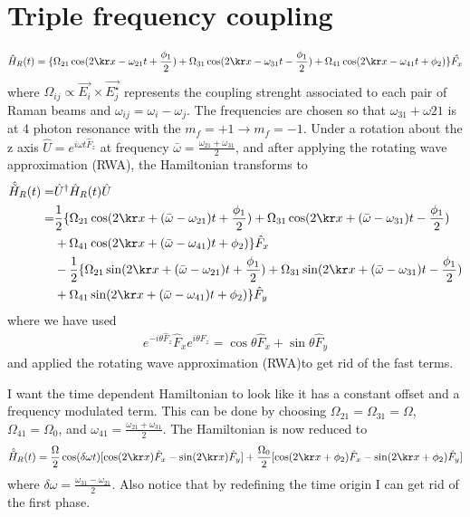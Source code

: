 \section{Triple frequency coupling}





%
\begin{align}
\hat{H}_R(t) = \lbrace\Omega_{21}\cos(2\kr x-\omega_{21} t +\frac{\phi_1}{2})+\Omega_{31}\cos(2\kr x-\omega_{31} t-\frac{\phi_1}{2})+\Omega_{41}\cos(2\kr x-\omega_{41} t + \phi_2)\rbrace\hat{F_x}
\end{align}
%
%
where $\Omega_{ij}\propto \vec{E_i}\times\vec{E_j^{\star}}$ represents the coupling strenght associated to each pair of Raman beams and $\omega_{ij} = \omega_{i}-\omega_{j} $. The frequencies are chosen so that $\omega_{31} + \omega{21}$ is at 4 photon resonance with the $m_f = +1\rightarrow m_f = -1$. Under a rotation about the z axis $\hat{U} = e^{i\omega t\hat{F}_z}$ at frequency $\bar{\omega} = \frac{\omega_{21}+\omega_{31}}{2}$, and after applying the rotating wave approximation (RWA), the Hamiltonian transforms to 
%
%
\begin{align}
\begin{split}
\hat{\tilde{H}}_R(t) = & \hat{U}^{\dagger} \hat{H}_R(t)\hat{U} \\
= & \frac{1}{2}\lbrace\Omega_{21}\cos(2\kr x+(\bar{\omega}-\omega_{21}) t +\frac{\phi_1}{2})+\Omega_{31}\cos(2\kr x+(\bar{\omega}-\omega_{31}) t -\frac{\phi_1}{2}) \\
& +\Omega_{41}\cos(2\kr x+(\bar{\omega}-\omega_{41}) t + \phi_2)\rbrace \hat{F}_x \\
& -  \frac{1}{2}\lbrace\Omega_{21}\sin(2\kr x+(\bar{\omega}-\omega_{21}) t +\frac{\phi_1}{2})+\Omega_{31}\sin(2\kr x+(\bar{\omega}-\omega_{31}) t-\frac{\phi_1}{2})\\
&+\Omega_{41}\sin(2\kr x+(\bar{\omega}-\omega_{41}) t+\phi_2)\rbrace \hat{F}_y
\end{split}
\end{align}
%
%
where we have used 
%
\begin{align}
e^{-i\theta \hat{F}_z} \hat{F}_x e^{i\theta \hat{F}_z}= \cos\theta \hat{F}_x + \sin\theta\hat{F}_y
\end{align}
%
and applied the rotating wave approximation (RWA)to get rid of the fast terms. 

I want the time dependent Hamiltonian to look like it has a constant offset and a frequency modulated term. This can be done by choosing $\Omega_{21} =\Omega_{31} = \Omega $, $\Omega_{41}=\Omega_0$, and $\omega_{41} =\frac{\omega_{21}+\omega_{31}}{2}$. The Hamiltonian is now reduced to 
%
%
\begin{align}
\begin{split}
\hat{\tilde{H}}_R(t) = \frac{\Omega}{2}\cos(\delta\omega t)[\cos(2\kr x)\hat{F}_x - \sin(2\kr x)\hat{F}_y] + \frac{\Omega_{0}}{2}[\cos(2\kr x + \phi_2)\hat{F}_x - \sin(2\kr x + \phi_2)\hat{F}_y] \\
\end{split}
\end{align}
%
%
where $\delta\omega=\frac{\omega_{31}-\omega_{21}}{2}$. Also notice that by redefining the time origin I can get rid of the first phase. 

